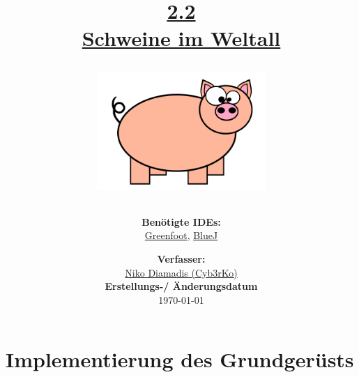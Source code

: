 \documentclass{scrartcl}   %
\begin{document}
\title{\huge{\href{https://www.inf-schule.de/oop/java/implementierung/siw}{2.2\\Schweine im Weltall}}\\
\vspace{0.5cm}
\begin{figure}[ht]
	\centering
	\includegraphics[height=4.5cm]{Schweine_im_Weltall.png}
\end{figure}
\vspace{0.7cm}}

\author{\textbf{Benötigte IDEs:}\\
\href{https://www.greenfoot.org/}{Greenfoot}, \href{https://www.bluej.org/}{BlueJ}
\vspace{1cm}}

\date{\textbf{Verfasser:}\\
\href{https://cyb3rko.de}{Niko Diamadis (Cyb3rKo)}\\
\vspace{1cm}
\textbf{Erstellungs-/ Änderungsdatum}\\
\today\enlargethispage{4cm}}

\doublespacing

\maketitle\thispagestyle{empty}

\cleardoublepage

\setcounter{page}{1}
\tableofcontents


\newpage
{}  %

\cleardoublepage

\section{Implementierung des Grundgerüsts}
\end{document}
